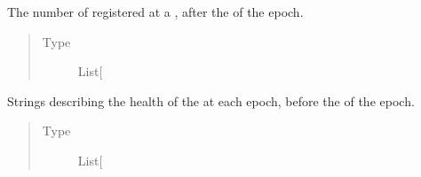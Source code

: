\documentclass[letterpaper,10pt,english]{sphinxmanual}
\begin{document}
\begin{fulllineitems}
\begin{fulllineitems}
\label{\detokenize{app.domain.helpers:app.domain.helpers.smart_dataclasses.LoggingData.cluster_size_am}}
The number of {\hyperref[\detokenize{app.domain:module-app.domain.network_nodes}]{}}
registered at a  {\hyperref[\detokenize{app.domain:app.domain.cluster_groups.Cluster.members}]{}},
after the {\hyperref[\detokenize{app.domain:app.domain.cluster_groups.Cluster.membership_maintenance}]{}}
of the epoch.
\begin{quote}\begin{description}
\item[{Type}] \leavevmode
List{[}\sphinxhref{https://docs.python.org/3.7/library/functions.html\#int}{int}{]}

\end{description}\end{quote}

\end{fulllineitems}


\begin{fulllineitems}
\label{\detokenize{app.domain.helpers:app.domain.helpers.smart_dataclasses.LoggingData.cluster_status_bm}}
Strings describing the health of the {\hyperref[\detokenize{app.domain:app.domain.cluster_groups.Cluster}]{}} at each epoch,
before the {\hyperref[\detokenize{app.domain:app.domain.cluster_groups.Cluster.membership_maintenance}]{}}
of the epoch.
\begin{quote}\begin{description}
\item[{Type}] \leavevmode
List{[}\sphinxhref{https://docs.python.org/3.7/library/stdtypes.html\#str}{str}{]}

\end{description}\end{quote}

\end{fulllineitems}


\end{fulllineitems}
\end{document}
